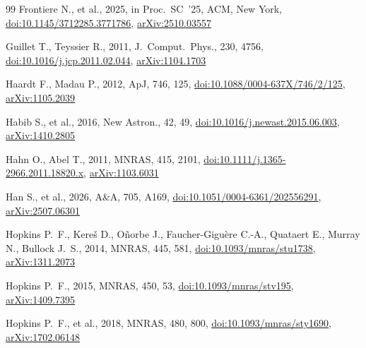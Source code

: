\documentclass[fleqn,usenatbib]{mnras}
\begin{document}
\begin{thebibliography}{99}
Frontiere N., et al., 2025, in Proc.\ SC~'25, ACM, New York,
\href{https://doi.org/10.1145/3712285.3771786}{doi:10.1145/3712285.3771786},
\href{https://arxiv.org/abs/2510.03557}{arXiv:2510.03557}

Guillet T., Teyssier R., 2011, J.\ Comput.\ Phys., 230, 4756,
\href{https://doi.org/10.1016/j.jcp.2011.02.044}{doi:10.1016/j.jcp.2011.02.044},
\href{https://arxiv.org/abs/1104.1703}{arXiv:1104.1703}

Haardt F., Madau P., 2012, ApJ, 746, 125,
\href{https://doi.org/10.1088/0004-637X/746/2/125}{doi:10.1088/0004-637X/746/2/125},
\href{https://arxiv.org/abs/1105.2039}{arXiv:1105.2039}

Habib S., et al., 2016, New Astron., 42, 49,
\href{https://doi.org/10.1016/j.newast.2015.06.003}{doi:10.1016/j.newast.2015.06.003},
\href{https://arxiv.org/abs/1410.2805}{arXiv:1410.2805}

Hahn O., Abel T., 2011, MNRAS, 415, 2101,
\href{https://doi.org/10.1111/j.1365-2966.2011.18820.x}{doi:10.1111/j.1365-2966.2011.18820.x},
\href{https://arxiv.org/abs/1103.6031}{arXiv:1103.6031}

Han S., et al., 2026, A\&A, 705, A169,
\href{https://doi.org/10.1051/0004-6361/202556291}{doi:10.1051/0004-6361/202556291},
\href{https://arxiv.org/abs/2507.06301}{arXiv:2507.06301}

Hopkins P.~F., Kere{\v s} D., O{\~n}orbe J., Faucher-Gigu{\`e}re C.-A., Quataert E., Murray N., Bullock J.~S., 2014, MNRAS, 445, 581,
\href{https://doi.org/10.1093/mnras/stu1738}{doi:10.1093/mnras/stu1738},
\href{https://arxiv.org/abs/1311.2073}{arXiv:1311.2073}

Hopkins P.~F., 2015, MNRAS, 450, 53,
\href{https://doi.org/10.1093/mnras/stv195}{doi:10.1093/mnras/stv195},
\href{https://arxiv.org/abs/1409.7395}{arXiv:1409.7395}

Hopkins P.~F., et al., 2018, MNRAS, 480, 800,
\href{https://doi.org/10.1093/mnras/sty1690}{doi:10.1093/mnras/sty1690},
\href{https://arxiv.org/abs/1702.06148}{arXiv:1702.06148}


\end{thebibliography}
\end{document}
